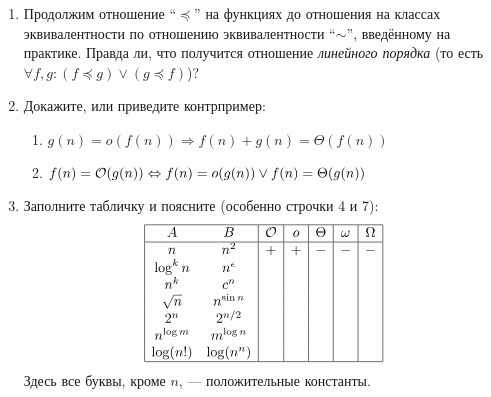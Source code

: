 \begin{enumerate}
\begin{enumerate}
\begin{proof}
        Так как $C$ всегда можно найти, то определение без конкретного $N$ оказывается эквивалентным исходному.
      \end{proof}
      \item Тот же вопрос про $o$.
      
      В данном случае неравенства будут строгими, но, делая те же самые рассуждения, которые были сделаны в пункте (a), можно понять, что $C$ тоже всегда удастся подобрать.
      \begin{equation}
        f(n) = o(g(n)), \quad \text{если } \quad \exists C > 0, N \in \N: \forall n \geq N \quad f(n) < C \cdot g(n)
      \end{equation}
      Определения будут эквивалентными.
    \end{enumerate}

  \item
    Продолжим отношение ``$\preceq$'' на функциях до отношения на классах эквивалентности по отношению эквивалентности ``$\sim$'', введённому на практике. Правда ли, что получится отношение \textit{линейного порядка} (то есть
    $\forall f, g: (f \preceq g) \lor (g \preceq f)$)?

  \item
    Докажите, или приведите контрпример:
    \begin{enumerate}
      \item $g(n) = o(f(n)) \Rightarrow f(n) + g(n) = \Theta(f(n))$
      \item $f(n) = \mathcal{O}(g(n)) \Leftrightarrow f(n) = o(g(n)) \lor f(n) = \Theta(g(n))$
    \end{enumerate}

  \item Заполните табличку и поясните (особенно строчки 4 и 7):
    $$
    \begin{array}{|cc|c|c|c|c|c|}
      \hline
      A & B & \mathcal{O} & o & \Theta & \omega & \Omega \\
      \hline
      n & n^2 & + & + & - & - & - \\
      \log^k n & n^{\epsilon} & & & & & \\
      n^k & c^n & & & & & \\
      \sqrt{n} & n^{\sin n} & & & & & \\
      2^n & 2^{n \slash 2} & & & & & \\
      n^{\log m} & m^{\log n} & & & & & \\
      \log (n!) & \log(n^n) & & & & & \\
      \hline
    \end{array}
    $$
    Здесь все буквы, кроме $n$, --- положительные константы.


\end{enumerate}
